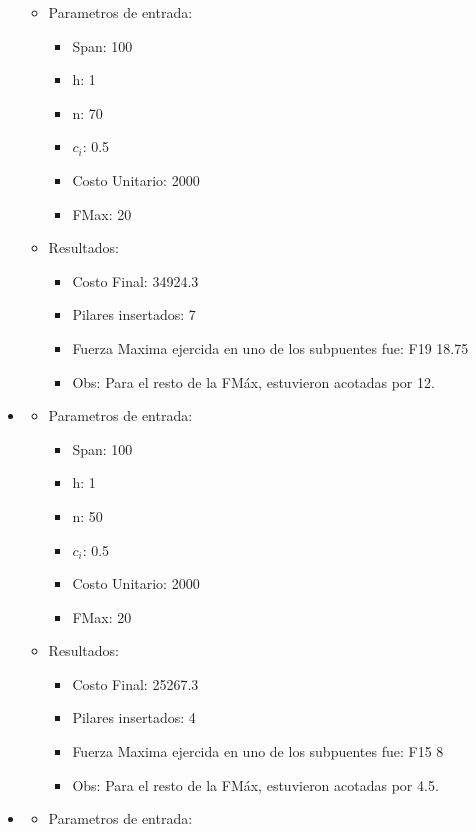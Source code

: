 \begin{itemize}
\begin{itemize}
    \item Parametros de entrada:
	  \begin{itemize}
	    \item Span: 100
	    \item h: 1
	    \item n: 70
	    \item $c_i$: 0.5
	    \item Costo Unitario: 2000
	    \item FMax: 20
	  \end{itemize}
      \item Resultados:
	  \begin{itemize}
	    \item Costo Final: 34924.3
	    \item Pilares insertados: 7
	    \item Fuerza Maxima ejercida en uno de los subpuentes fue: F19 18.75
	    \item Obs: Para el resto de la FM\'ax, estuvieron acotadas por 12.
	  \end{itemize}
      \end{itemize}
\item
  \begin{itemize}
    \item Parametros de entrada:
	  \begin{itemize}
	    \item Span: 100
	    \item h: 1
	    \item n: 50
	    \item $c_i$: 0.5
	    \item Costo Unitario: 2000
	    \item FMax: 20
	  \end{itemize}
      \item Resultados:
	  \begin{itemize}
	    \item Costo Final: 25267.3
	    \item Pilares insertados: 4
	    \item Fuerza Maxima ejercida en uno de los subpuentes fue: F15 8
	    \item Obs: Para el resto de la FM\'ax, estuvieron acotadas por 4.5.
	  \end{itemize}
      \end{itemize}
\item
  \begin{itemize}
    \item Parametros de entrada:

\end{itemize}
\end{itemize}
